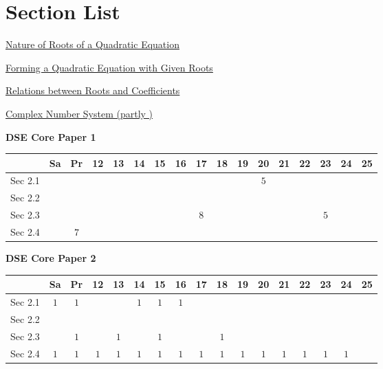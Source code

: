 \documentclass[12pt, a4paper]{article}
\begin{document}
\section*{Section List}
\begin{enumx}[label=Sec 2.\arabic*\ ]
\item \hyperref[section:4-2-1]{Nature of Roots of a Quadratic Equation }
\item \hyperref[section:4-2-2]{Forming a Quadratic Equation with Given Roots}
\item \hyperref[section:4-2-3]{Relations between Roots and Coefficients \NF}
\item \hyperref[section:4-2-4]{Complex Number System (partly \NF)}
\end{enumx}
\begin{absolutelynopagebreak}
\begin{center}
\textbf{DSE Core Paper 1}
\end{center}
\begin{center}
\begin{tabular}{|l|c|c|c|c|c|c|c|c|c|c|c|c|c|c|c|c|}
\hline
        & Sa & Pr & 12 & 13 & 14 & 15 & 16 & 17 & 18 & 19 & 20 & 21 & 22 & 23 & 24 & 25 \\\hline\hline
Sec 2.1 &  &  &  &  &  &  &  &  &  &  &  $5$ &  &  &  &  &  \\\hline
Sec 2.2 &  &  &  &  &  &  &  &  &  &  &  &  &  &  &  &  \\\hline
Sec 2.3 &  &  &  &  &  &  &  &  $8$ &  &  &  &  &  &  $5$ &  &  \\\hline
Sec 2.4 &  &  $7$ &  &  &  &  &  &  &  &  &  &  &  &  &  &  \\\hline
\end{tabular}
\end{center}
\end{absolutelynopagebreak}
\begin{absolutelynopagebreak}
\begin{center}
\textbf{DSE Core Paper 2}
\end{center}
\begin{center}
\begin{tabular}{|l|c|c|c|c|c|c|c|c|c|c|c|c|c|c|c|c|}
\hline
        & Sa & Pr & 12 & 13 & 14 & 15 & 16 & 17 & 18 & 19 & 20 & 21 & 22 & 23 & 24 & 25 \\\hline\hline
Sec 2.1 &  $1$ &  $1$ &  &  &  $1$ &  $1$ &  $1$ &  &  &  &  &  &  &  &  &  \\\hline
Sec 2.2 &  &  &  &  &  &  &  &  &  &  &  &  &  &  &  &  \\\hline
Sec 2.3 &  &  $1$ &  &  $1$ &  &  $1$ &  &  &  $1$ &  &  &  &  &  &  &  \\\hline
Sec 2.4 &  $1$ &  $1$ &  $1$ &  $1$ &  $1$ &  $1$ &  $1$ &  $1$ &  $1$ &  $1$ &  $1$ &  $1$ &  $1$ &  $1$ &  $1$ &  \\\hline
\end{tabular}
\end{center}
\end{absolutelynopagebreak}
\end{document}
